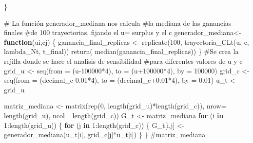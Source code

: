 \documentclass[
  us-letterpaper,
]{scrreprt}
\newenvironment{Shaded}{\begin{snugshade}}{\end{snugshade}}
\newcommand{\AttributeTok}[1]{\textcolor[rgb]{0.40,0.45,0.13}{#1}}
\newcommand{\CommentTok}[1]{\textcolor[rgb]{0.37,0.37,0.37}{#1}}
\newcommand{\ControlFlowTok}[1]{\textcolor[rgb]{0.00,0.23,0.31}{\textbf{#1}}}
\newcommand{\DecValTok}[1]{\textcolor[rgb]{0.68,0.00,0.00}{#1}}
\newcommand{\FloatTok}[1]{\textcolor[rgb]{0.68,0.00,0.00}{#1}}
\newcommand{\FunctionTok}[1]{\textcolor[rgb]{0.28,0.35,0.67}{#1}}
\newcommand{\NormalTok}[1]{\textcolor[rgb]{0.00,0.23,0.31}{#1}}
\newcommand{\OtherTok}[1]{\textcolor[rgb]{0.00,0.23,0.31}{#1}}
\newcommand{\SpecialCharTok}[1]{\textcolor[rgb]{0.37,0.37,0.37}{#1}}
\theoremstyle{definition}
\theoremstyle{plain}
\theoremstyle{plain}
\theoremstyle{remark}
\begin{document}
\begin{Shaded}
\begin{Highlighting}[]
\NormalTok{\}}

\CommentTok{\# La función generador\_mediana nos calcula }
\CommentTok{\#la mediana de las ganancias finales }
\CommentTok{\#de 100 trayectorias, fijando el u= surplus y el c}
\NormalTok{generador\_mediana}\OtherTok{\textless{}{-}} \ControlFlowTok{function}\NormalTok{(ui,cj)}
\NormalTok{  \{}
\NormalTok{  ganancia\_final\_replicas }\OtherTok{\textless{}{-}} \FunctionTok{replicate}\NormalTok{(}\DecValTok{100}\NormalTok{, }
                                       \FunctionTok{trayectoria\_CLt}\NormalTok{(u, c,}
\NormalTok{                                        lambda\_Nt, t\_final))}
  \FunctionTok{return}\NormalTok{( }\FunctionTok{median}\NormalTok{(ganancia\_final\_replicas))}
\NormalTok{  \}}
\CommentTok{\#Se crea la rejilla donde se hace el analisis de sensibilidad}
\CommentTok{\#para diferentes valores de u y c}
\NormalTok{grid\_u }\OtherTok{\textless{}{-}} \FunctionTok{seq}\NormalTok{(}\AttributeTok{from =}\NormalTok{ (u}\DecValTok{{-}100000}\SpecialCharTok{*}\DecValTok{4}\NormalTok{), }\AttributeTok{to =}\NormalTok{ (u}\SpecialCharTok{+}\DecValTok{100000}\SpecialCharTok{*}\DecValTok{4}\NormalTok{), }\AttributeTok{by =} \DecValTok{100000}\NormalTok{)}
\NormalTok{grid\_c }\OtherTok{\textless{}{-}} \FunctionTok{seq}\NormalTok{(}\AttributeTok{from =}\NormalTok{ (decimal\_c}\FloatTok{{-}0.01}\SpecialCharTok{*}\DecValTok{4}\NormalTok{), }\AttributeTok{to =}\NormalTok{ (decimal\_c}\FloatTok{+0.01}\SpecialCharTok{*}\DecValTok{4}\NormalTok{), }
              \AttributeTok{by =} \FloatTok{0.01}\NormalTok{)}
\NormalTok{u\_t }\OtherTok{\textless{}{-}}\NormalTok{ grid\_u}

\NormalTok{matriz\_mediana }\OtherTok{\textless{}{-}} \FunctionTok{matrix}\NormalTok{(}\FunctionTok{rep}\NormalTok{(}\DecValTok{0}\NormalTok{, }\FunctionTok{length}\NormalTok{(grid\_u)}\SpecialCharTok{*}\FunctionTok{length}\NormalTok{(grid\_c)),}
\AttributeTok{nrow=} \FunctionTok{length}\NormalTok{(grid\_u), }\AttributeTok{ncol=} \FunctionTok{length}\NormalTok{(grid\_c))}
\NormalTok{G\_t }\OtherTok{\textless{}{-}}\NormalTok{ matriz\_mediana}
\ControlFlowTok{for}\NormalTok{ (i }\ControlFlowTok{in} \DecValTok{1}\SpecialCharTok{:}\FunctionTok{length}\NormalTok{(grid\_u)) }
\NormalTok{  \{}
    \ControlFlowTok{for}\NormalTok{ (j }\ControlFlowTok{in} \DecValTok{1}\SpecialCharTok{:}\FunctionTok{length}\NormalTok{(grid\_c)) }
\NormalTok{      \{}
\NormalTok{        G\_t[i,j] }\OtherTok{\textless{}{-}} \FunctionTok{generador\_mediana}\NormalTok{(u\_t[i],}
\NormalTok{                              grid\_c[j]}\SpecialCharTok{*}\NormalTok{u\_t[i])}
\NormalTok{      \}}
\NormalTok{  \}  }
\CommentTok{\#matriz\_mediana}


\end{Highlighting}
\end{Shaded}
\end{document}
